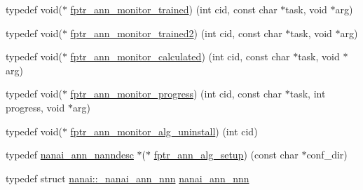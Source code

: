 \begin{DoxyCompactItemize}
\item 
typedef void($\ast$ \hyperlink{namespacenanai_adb209ab120b98e800db2b0c8621cd488}{fptr\+\_\+ann\+\_\+monitor\+\_\+trained}) (int cid, const char $\ast$task, void $\ast$arg)
\item 
typedef void($\ast$ \hyperlink{namespacenanai_a598e872bf861dac8080e98d6d155b3b5}{fptr\+\_\+ann\+\_\+monitor\+\_\+trained2}) (int cid, const char $\ast$task, void $\ast$arg)
\item 
typedef void($\ast$ \hyperlink{namespacenanai_afc00080af95a1dc2349880f03d7d6a88}{fptr\+\_\+ann\+\_\+monitor\+\_\+calculated}) (int cid, const char $\ast$task, void $\ast$arg)
\item 
typedef void($\ast$ \hyperlink{namespacenanai_a5c9964edbd4db8ae35df7cd024020e87}{fptr\+\_\+ann\+\_\+monitor\+\_\+progress}) (int cid, const char $\ast$task, int progress, void $\ast$arg)
\item 
typedef void($\ast$ \hyperlink{namespacenanai_a04b231ce428a771ab1a9aace53be65c6}{fptr\+\_\+ann\+\_\+monitor\+\_\+alg\+\_\+uninstall}) (int cid)
\item 
typedef \hyperlink{namespacenanai_a892a8c80381d0005a076b68fbbf2d918}{nanai\+\_\+ann\+\_\+nanndesc} $\ast$($\ast$ \hyperlink{namespacenanai_af358544d3d83ecb56361b1eaa46a0e98}{fptr\+\_\+ann\+\_\+alg\+\_\+setup}) (const char $\ast$conf\+\_\+dir)
\item 
typedef struct \hyperlink{structnanai_1_1__nanai__ann__nnn}{nanai\+::\+\_\+nanai\+\_\+ann\+\_\+nnn} \hyperlink{namespacenanai_a2a6647c825fde0177764e042130b8b99}{nanai\+\_\+ann\+\_\+nnn}
\end{DoxyCompactItemize}
